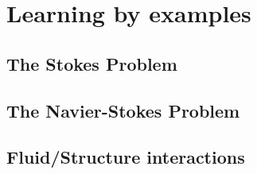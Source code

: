 %
%
%
%
%


\chapter{Learning by examples}
\label{cha:examples}


\section{The Stokes Problem}
\label{sec:stokesproblem}



\section{The Navier-Stokes Problem}
\label{sec:navierstokesproblem}



\section{Fluid/Structure interactions}
\label{sec:gettingstarted}





%
%
